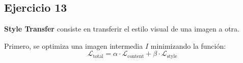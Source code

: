 \documentclass[a4paper,11pt]{article}
\begin{document}
\subsection*{Ejercicio 13}
\textbf{Style Transfer} consiste en transferir el estilo visual de una imagen a otra.

Primero, se optimiza una imagen intermedia $I$ minimizando la función: \[\mathcal{L}_{\text{total}} = \alpha \cdot \mathcal{L}_{\text{content}} + \beta \cdot \mathcal{L}_{\text{style}}\]
\end{document}
